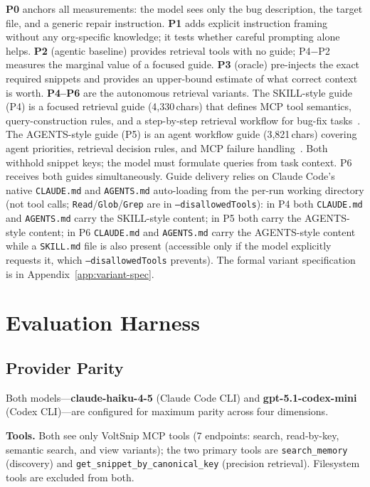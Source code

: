 \documentclass[10pt,conference]{IEEEtran}
\begin{document}
\textbf{P0} anchors all measurements: the model sees only the bug description, the target file, and a generic repair instruction.
\textbf{P1} adds explicit instruction framing without any org-specific knowledge; it tests whether careful prompting alone helps.
\textbf{P2} (agentic baseline) provides retrieval tools with no guide; P4$-$P2 measures the marginal value of a focused guide.
\textbf{P3} (oracle) pre-injects the exact required snippets and provides an upper-bound estimate of what correct context is worth.
\textbf{P4--P6} are the autonomous retrieval variants.
The SKILL-style guide (P4) is a focused retrieval guide (4,330\,chars) that
defines MCP tool semantics, query-construction rules, and a step-by-step
retrieval workflow for bug-fix tasks~\cite{li2026skillsbench}.
The AGENTS-style guide (P5) is an agent workflow guide (3,821\,chars)
covering agent priorities, retrieval decision rules, and MCP failure
handling~\cite{gloaguen2026agentsmd}.
Both withhold snippet keys; the model must formulate queries from task context.
P6 receives both guides simultaneously.
Guide delivery relies on Claude Code's native \texttt{CLAUDE.md} and
\texttt{AGENTS.md} auto-loading from the per-run working directory (not
tool calls; \texttt{Read}/\texttt{Glob}/\texttt{Grep} are in
\texttt{--disallowedTools}): in P4 both \texttt{CLAUDE.md} and
\texttt{AGENTS.md} carry the SKILL-style content; in P5 both carry
the AGENTS-style content; in P6 \texttt{CLAUDE.md} and \texttt{AGENTS.md}
carry the AGENTS-style content while a \texttt{SKILL.md} file is also
present (accessible only if the model explicitly requests it, which
\texttt{--disallowedTools} prevents).
The formal variant specification is in Appendix~\ref{app:variant-spec}.

\section{Evaluation Harness}
\label{sec:harness}

\subsection{Provider Parity}
\label{sec:provider-parity}

Both models---\textbf{claude-haiku-4-5} (Claude Code CLI) and \textbf{gpt-5.1-codex-mini} (Codex CLI)---are configured for maximum parity across four dimensions.

\textbf{Tools.} Both see only VoltSnip MCP tools (7 endpoints: search,
read-by-key, semantic search, and view variants); the two primary tools
are \texttt{search\_memory} (discovery) and
\texttt{get\_snippet\_by\_canonical\_key} (precision retrieval).
Filesystem tools are excluded from both.
\end{document}

